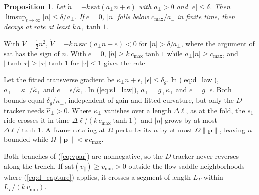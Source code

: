 \documentclass[lettersize,journal]{IEEEtran}
\newtheorem{proposition}{Proposition}
\begin{document}
\begin{proposition}
Let $\dot{n} = -k\,\mathrm{sat}(a_\perp n + e)$ with $a_\perp > 0$ and
$|e| \leq \delta$. Then $\limsup_{t\to\infty}|n| \leq \delta/a_\perp$.
If $e = 0$, $|n|$ falls below $c_{\max}/a_\perp$ in finite time, then
decays at rate at least $k\,a_\perp\tanh 1$.
\end{proposition}

\begin{IEEEproof}
With $V = \tfrac{1}{2}n^2$,
$\dot{V} = -k\,n\,\mathrm{sat}(a_\perp n + e) < 0$ for
$|n| > \delta/a_\perp$, where the argument of $\mathrm{sat}$ has the
sign of $n$. With $e = 0$, $|\dot{n}| \geq k\,c_{\max}\tanh 1$
while $a_\perp|n| \geq c_{\max}$, and $|\tanh x| \geq |x|\tanh 1$ for
$|x| \leq 1$ gives the rate.
\end{IEEEproof}

Let the fitted transverse gradient be $\kappa_\perp n + \epsilon$,
$|\epsilon| \leq \delta_g$. In (\ref{eq:d_law}),
$a_\perp = \kappa_\perp/\hat{\kappa}_\perp$ and
$e = \epsilon/\hat{\kappa}_\perp$. In (\ref{eq:s1_law}),
$a_\perp = g_\perp\kappa_\perp$ and $e = g_\perp\epsilon$. Both bounds
equal $\delta_g/\kappa_\perp$, independent of gain and fitted
curvature, but only the $D$ tracker needs $\hat{\kappa}_\perp > 0$.
Where $\kappa_\perp$ vanishes over a length $\Delta\ell$, as at the
fold, the $s_1$ ride crosses it in time $\Delta\ell/(k\,c_{\max}\tanh 1)$
and $|n|$ grows by at most $\Delta\ell/\tanh 1$. A frame rotating at
$\Omega$ perturbs its $\dot{n}$ by at most $\Omega\lVert\mathbf{p}\rVert$,
leaving $n$ bounded while $\Omega\lVert\mathbf{p}\rVert < k\,c_{\max}$.

Both branches of (\ref{eq:vpar}) are nonnegative, so the $D$ tracker
never reverses along the trench. If $\mathrm{sat}(v_\parallel) \geq v_{\min} > 0$ outside
the flow-saddle neighborhoods where (\ref{eq:d_capture}) applies, it crosses a
segment of length $L_\Gamma$ within $L_\Gamma/(k\,v_{\min})$.
\end{document}
